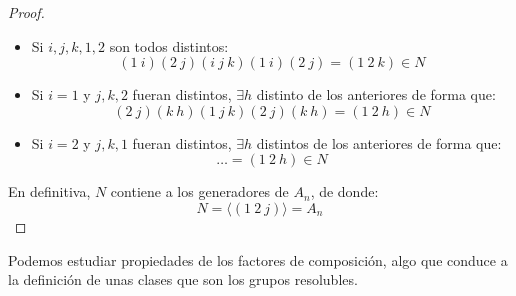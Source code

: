 \begin{teo}[de Abel]
\begin{proof}
        \begin{itemize}
            \item Si $i,j,k,1,2$ son todos distintos:
                \begin{equation*}
                    (1\ i)(2\ j)(i\ j\ k)(1\ i)(2\ j) = (1\ 2\ k) \in N
                \end{equation*}
            \item Si $i = 1$ y $j, k, 2$ fueran distintos, $\exists h$ distinto de los anteriores de forma que:
                \begin{equation*}
                    (2\ j)(k\ h)(1\ j\ k)(2\ j)(k\ h) = (1\ 2\ h) \in N
                \end{equation*}
            \item Si $i = 2$ y $j, k, 1$ fueran distintos, $\exists h$ distintos de los anteriores de forma que:
                \begin{equation*} %
                    \ldots = (1\ 2\ h) \in N
                \end{equation*}
        \end{itemize}
        En definitiva, $N$ contiene a los generadores de $A_n$, de donde:
        \begin{equation*}
            N = \langle (1\ 2\ j) \rangle  = A_n
        \end{equation*}
    \end{proof}
\end{teo}

Podemos estudiar propiedades de los factores de composición, algo que conduce a la definición de unas clases que son los grupos resolubles.

